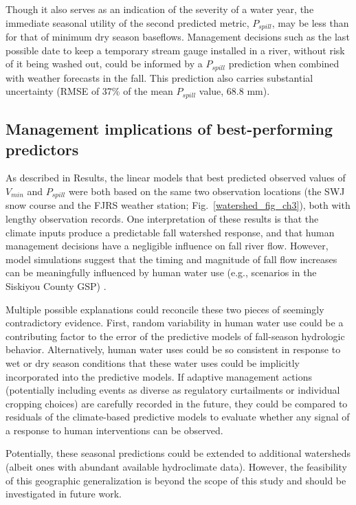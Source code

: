 \documentclass[hess, manuscript]{copernicus}
\begin{document}
Though it also serves as an indication of the severity of a water year,
the immediate seasonal utility of the second predicted metric,
$P_{spill}$, may be less than for that of minimum dry season
baseflows. Management decisions such as the last possible date to keep a
temporary stream gauge installed in a river, without risk of it being
washed out, could be informed by a $P_{spill}$ prediction when
combined with weather forecasts in the fall. This prediction also
carries substantial uncertainty (RMSE of 37\% of the mean $P_{spill}$
value, 68.8 mm).

\subsection{Management implications of best-performing predictors}

As described in Results, the linear models that best predicted observed
values of $V_{min}$ and $P_{spill}$ were both based on the same two
observation locations (the SWJ snow course and the FJRS weather station;
Fig.~\ref{watershed_fig_ch3}), both with lengthy observation records.
One interpretation of these results is that the climate inputs produce a
predictable fall watershed response, and that human management decisions
have a negligible influence on fall river flow. However, model
simulations suggest that the timing and magnitude of fall flow increases
can be meaningfully influenced by human water use (e.g., scenarios in
the Siskiyou County GSP) \citep{SiskiyouCounty2021}.

Multiple possible explanations could reconcile these two pieces of
seemingly contradictory evidence. First, random variability in human
water use could be a contributing factor to the error of the predictive
models of fall-season hydrologic behavior. Alternatively, human water
uses could be so consistent in response to wet or dry season conditions
that these water uses could be implicitly incorporated into the
predictive models. If adaptive management actions (potentially including
events as diverse as regulatory curtailments or individual cropping
choices) are carefully recorded in the future, they could be compared to
residuals of the climate-based predictive models to evaluate whether any
signal of a response to human interventions can be observed.

Potentially, these seasonal predictions could be extended to additional
watersheds (albeit ones with abundant available hydroclimate data).
However, the feasibility of this geographic generalization is beyond the
scope of this study and should be investigated in future work.
\end{document}
